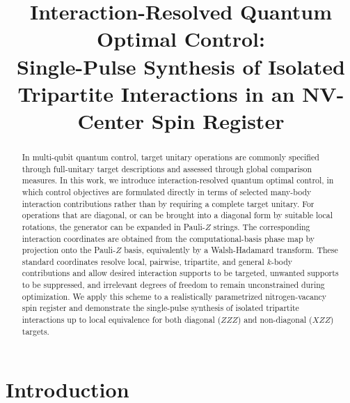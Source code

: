 \documentclass[
  aps,
  pra,
  reprint,            %
  superscriptaddress, %
  amsmath,amssymb,
  notitlepage
]{revtex4-2}
\theoremstyle{plain}
\theoremstyle{definition}
\theoremstyle{definition}
\begin{document}
\title{Interaction-Resolved Quantum Optimal Control:\\ Single-Pulse Synthesis of Isolated Tripartite Interactions in an NV-Center Spin Register}

\begin{abstract}
\noindent
In multi-qubit quantum control, target unitary operations are commonly specified through full-unitary target descriptions and assessed through global comparison measures. In this work, we introduce interaction-resolved quantum optimal control, in which control objectives are formulated directly in terms of selected many-body interaction contributions rather than by requiring a complete target unitary. For operations that are diagonal, or can be brought into a diagonal form by suitable local rotations, the generator can be expanded in Pauli-$Z$ strings. The corresponding interaction coordinates are obtained from the computational-basis phase map by projection onto the Pauli-$Z$ basis, equivalently by a Walsh-Hadamard transform. These standard coordinates resolve local, pairwise, tripartite, and general $k$-body contributions and allow desired interaction supports to be targeted, unwanted supports to be suppressed, and irrelevant degrees of freedom to remain unconstrained during optimization. We apply this scheme to a realistically parametrized nitrogen-vacancy spin register and demonstrate the single-pulse synthesis of isolated tripartite interactions up to local equivalence for both diagonal ($ZZZ$) and non-diagonal ($XZZ$) targets.
\end{abstract}



\maketitle

\section*{Introduction}
\end{document}
